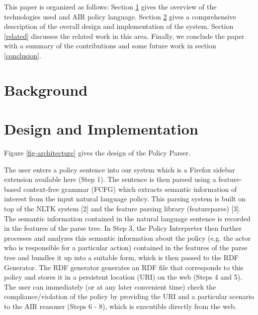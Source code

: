 \documentclass{llncs}
\begin{document}

This paper is organized as follows:
Section \ref{background} gives the overview of the technologies used and AIR policy language.  
Section \ref{design} gives a comprehensive description of the overall design and implementation of the system.
Section \ref{related} discusses the related work in this area.
Finally, we conclude the paper with a summary of the contributions and some future work in section \ref{conclusion}.



\section{Background} \label{background}



\section{Design and Implementation} \label{design}

Figure \ref{fig-architecture} gives the design of the Policy Parser.

The user enters a policy sentence into our system which is a Firefox sidebar extension available here (Step 1). The sentence is then parsed using a feature-based context-free grammar (FCFG) which extracts semantic information of interest from the input natural language policy. This parsing system is built on top of the NLTK system [2] and the feature parsing library (featureparse) [3]. The semantic information contained in the natural language sentence is recorded in the features of the parse tree. In Step 3, the Policy Interpreter then further processes and analyzes this semantic information about the policy (e.g. the actor who is responsible for a particular action) contained in the features of the parse tree and bundles it up into a suitable form, which is then passed to the RDF Generator. The RDF generator generates an RDF file that corresponds to this policy and stores it in a persistent location (URI) on the web (Steps 4 and 5). The user can immediately (or at any later convenient time) check the compliance/violation of the policy by providing the URI and a particular scenario to the AIR reasoner (Steps 6 - 8), which is executible directly from the web.
\end{document}
